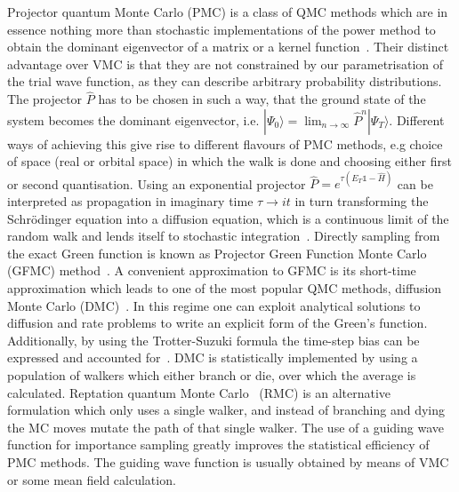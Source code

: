 Projector quantum Monte Carlo (PMC) is a class of QMC methods which are in essence nothing more than stochastic implementations of the power method to obtain the dominant eigenvector of a matrix or a kernel function~\cite{gubernatis_kawashima_werner_2016}. Their distinct advantage over VMC is that they are not constrained by our parametrisation of the trial wave function, as they can describe arbitrary probability distributions. The projector $\hat P$ has to be chosen in such a way, that the ground state of the system becomes the dominant eigenvector, i.e. $| \Psi_{0}\rangle = \lim_{n\rightarrow \infty} \hat{P}^n |\Psi_{T}\rangle$. Different ways of achieving this give rise to different flavours of PMC methods, e.g choice of space (real or orbital space) in which the walk is done and choosing either first or second quantisation. Using an exponential projector $\hat{P} = e^{\tau (E_T \mathbb{1} - \hat{H})}$ can be interpreted as propagation in imaginary time $\tau \rightarrow it$ in turn transforming the Schr\"odinger equation into a diffusion equation, which is a continuous limit of the random walk and lends itself to stochastic integration~\cite{reynolds1990diffusion}. Directly sampling from the exact Green function is known as Projector Green Function Monte Carlo (GFMC) method~\cite{kalos1962monte, kalos1966stochastic}. A convenient approximation to GFMC is its short-time approximation which leads to one of the most popular QMC methods, diffusion Monte Carlo (DMC)~\cite{foulkes2001quantum, reynolds1990diffusion}. In this regime one can exploit analytical solutions to diffusion and rate problems to write an explicit form of the Green's function. Additionally, by using the Trotter-Suzuki formula the time-step bias can be expressed and accounted for~\cite{austin2012quantum}. DMC is statistically implemented by using a population of walkers which either branch or die, over which the average is calculated. Reptation quantum Monte Carlo~\cite{reynolds1990diffusion} (RMC) is an alternative formulation which only uses a single walker, and instead of branching and dying the MC moves mutate the path of that single walker. The use of a guiding wave function for importance sampling greatly improves the statistical efficiency of PMC methods. The guiding wave function is usually obtained by means of VMC or some mean field calculation. 

